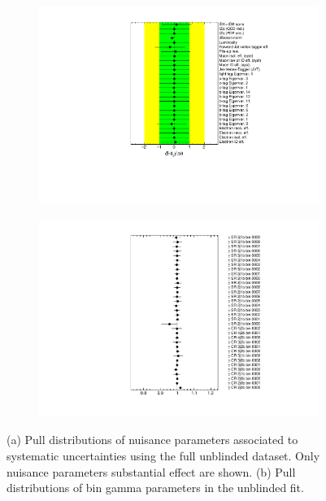 \begin{figure}[!h] 
  \begin{subfigure}[b]{0.49\linewidth}
    \centering
    \includegraphics[width=1.3\textwidth]{ubonn-thesis/Chapters/Chapters_07/Figure/Data/NuisPar.pdf}
    \caption{}
    \label{fig:datapull}
  \end{subfigure}%
  \begin{subfigure}[b]{0.49\linewidth}
    \centering
    \includegraphics[width=1.1\textwidth]{ubonn-thesis/Chapters/Chapters_07/Figure/Data/Gammas.pdf}
   \caption{}
  \end{subfigure}
  \caption{(a) Pull distributions of nuisance parameters associated to systematic uncertainties using the full unblinded dataset. Only nuisance parameters substantial effect are shown. (b) Pull distributions of bin gamma parameters in the unblinded fit.}
\end{figure}

